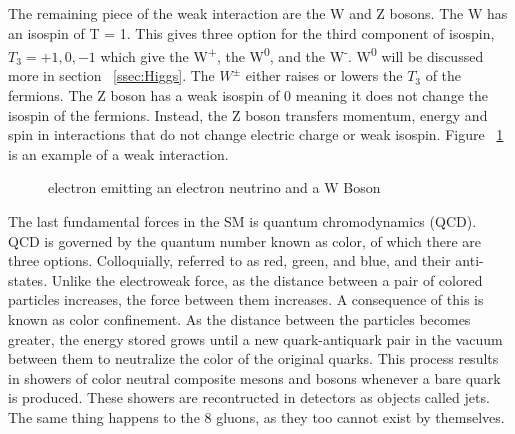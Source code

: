  \indent The remaining piece of the weak interaction are the W and Z bosons. The W has an isospin of T = 1. This gives three option for the third component of isospin, ${T_{3} = +1, 0, -1}$ which give the W\textsuperscript{+}, the W\textsuperscript{0}, and the W\textsuperscript{-}. W\textsuperscript{0} will be discussed more in section ~\ref{ssec:Higgs}. The ${W^{\pm}}$ either raises or lowers the ${T_{3}}$ of the fermions. The Z boson has a weak isospin of 0 meaning it does not change the isospin of the fermions. Instead, the Z boson transfers momentum, energy and spin in interactions that do not change electric charge or weak isospin. Figure ~\ref{Fig:weak_dia} is an example of a weak interaction.\newline

\begin{figure}[h]
\begin{center}

\caption{electron emitting an electron neutrino and a W Boson}
\label{Fig:weak_dia}
\end{center}
\end{figure}


The last fundamental forces in the SM is quantum chromodynamics (QCD). QCD is governed by the quantum number known as color, of which there are three options. Colloquially, referred to as red, green, and blue, and their anti-states. Unlike the electroweak force, as the distance between a pair of colored particles increases, the force between them increases. A consequence of this is known as color confinement. As the distance between the particles becomes greater, the energy stored grows until a new quark-antiquark pair in the vacuum between them to neutralize the color of the original quarks. This process results in showers of color neutral composite mesons and bosons  whenever a bare quark is produced. These showers are recontructed in detectors as objects called jets. The same thing happens to the 8 gluons, as they too cannot exist by themselves.
